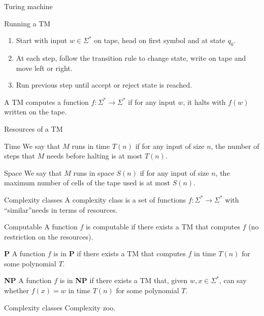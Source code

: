 \documentclass{beamer} %
\theoremstyle{definition}
\theoremstyle{remark}
\begin{document}
\begin{frame}{Turing machine}
	\begin{block}{Running a TM}
		\begin{enumerate}
			\pause
			\item Start with input $w \in \Sigma^*$ on tape, head on first symbol and at state $q_0$.
			\pause
			\item At each step, follow the transition rule to change state, write on tape and move left or right.
			\pause
			\item Run previous step until accept or reject state is reached.
		\end{enumerate}
	\end{block}
	\pause
	A TM computes a function $f:\Sigma^* \rightarrow \Sigma^*$ if for any input $w$, it halts with $f(w)$ written on the tape.
\end{frame}
\begin{frame}{Resources of a TM}
	\begin{block}{Time}
		We say that $M$ runs in time $T(n)$ if for any input of size $n$, the number of steps that $M$ needs before halting is at most $T(n)$.
	\end{block}
	\pause
	\begin{block}{Space}
		We say that $M$ runs in space $S(n)$ if for any input of size $n$, the maximum number of cells of the tape used is at most $S(n)$.
	\end{block}
\end{frame}
\begin{frame}{Complexity classes}
	A complexity class is a set of functions $f: \Sigma^* \rightarrow \Sigma^*$ with \textquotedblleft similar\textquotedblright needs in terms of resources.
	\pause
	\begin{block}{Computable}
		A function $f$ is computable if there exists a TM that computes $f$ (no restriction on the resources).
	\end{block}
	\pause
	\begin{block}{\textbf{P}}
		A function $f$ is in \textbf{P} if there exists a TM that computes $f$ in time $T(n)$ for some polynomial $T$.
	\end{block}
	\pause
	\begin{block}{\textbf{NP}}
		A function $f$ is in \textbf{NP} if there exists a TM that, given $w,x \in \Sigma^*$, can say whether $f(x) = w$ in time $T(n)$ for some polynomial $T$.
	\end{block}
\end{frame}
\begin{frame}{Complexity classes}
	Complexity zoo.
\end{frame}
\end{document}
